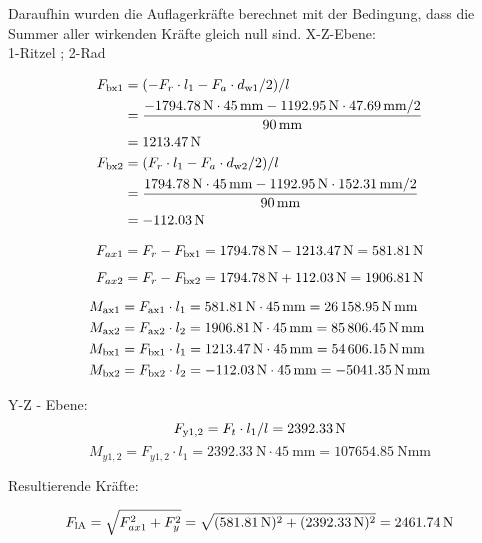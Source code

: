 \documentclass[15pt,a4paper]{article}
\begin{document}
     
     Daraufhin wurden die Auflagerkräfte berechnet mit der Bedingung, dass die Summer aller wirkenden Kräfte gleich null sind. X-Z-Ebene:\\
     1-Ritzel ; 2-Rad
     
     \begin{align*}
     	F_{\rm bx1} &=(-F_r\cdot l_1-F_a\cdot d_{\rm w1}/2)/l\\
     	&=\frac{-\SI{1794,78}{\newton}\cdot\SI{45}{\milli\m}-\SI{1192,95}{\newton} \cdot \SI{47,69}{\milli\m}/2}{\SI{90}{\milli\m}}\\
     	&=\SI{1213,47}{\newton}\\
     	F_{\rm bx2} &=(F_r\cdot l_1-F_a\cdot d_{\rm w2}/2)/l \\
     	&= \frac{\SI{1794,78}{\newton}\cdot\SI{45}{\milli\m}-\SI{1192,95}{\newton} \cdot \SI{152,31}{\milli\m}/2}{\SI{90}{\milli\m}}\\
     	&=\SI{-112,03}{\newton}
     \end{align*}
     
     $$F_{ax1} = F_r -F_{\rm bx1} = \SI{1794,78}{\newton} - \SI{1213,47}{\newton} = \SI{581,81}{\newton}$$
     
     $$F_{ax2} = F_r -F_{\rm bx2} = \SI{1794,78}{\newton} + \SI{112,03}{\newton} = \SI{1906,81}{\newton}$$
     
     \begin{align*}
     	M_{\rm ax1} &= F_{\rm ax1} \cdot l_1  = \SI{581,81}{\newton}\cdot \SI{45}{\milli\m} = \SI{26158,95}{\newton\milli\m}\\
     	M_{\rm ax2} &= F_{\rm ax2} \cdot l_2  = \SI{1906,81}{\newton}\cdot \SI{45}{\milli\m}  = \SI{85806,45}{\newton\milli\m}\\
     	M_{\rm bx1} &= F_{\rm bx1} \cdot l_1  = \SI{1213,47}{\newton}\cdot \SI{45}{\milli\m}  = \SI{54606,15}{\newton\milli\m}\\
     	M_{\rm bx2} &= F_{\rm bx2} \cdot l_2  = \SI{-112,03}{\newton}\cdot \SI{45}{\milli\m} = \SI{-5041,35}{\newton\milli\m}\\
     \end{align*}
     
     
     Y-Z - Ebene:
     $$F_{\rm y 1,2} = F_t \cdot l_1/l = \SI{2392,33}{\newton}$$
     $$M_{y1,2}= F_{y1,2} \cdot l_1= \SI{2392,33}{\newton} \cdot \SI{45}{\milli\m}=\SI{107654,85}{ \newton \milli\meter}$$
     
     Resultierende Kräfte:
     
     $$F_{\rm lA}= \sqrt{F_{ax1}^2+F_y^2}=\sqrt{(\SI{581,81}{\newton})^2 + (\SI{2392,33}{\newton})^2} = \SI{2461,74}{\newton}$$
     
\end{document}
